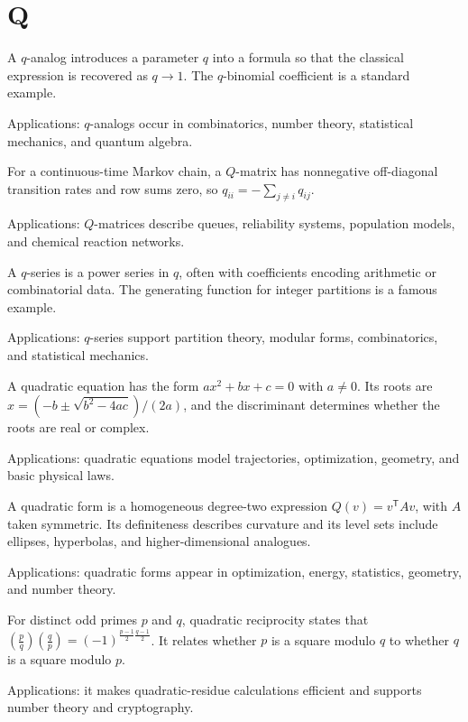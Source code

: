 \chapter*{Q}
\label{chap:q}

A $q$-analog introduces a parameter $q$ into a formula so that the classical expression is recovered as $q\to1$. The $q$-binomial coefficient is a standard example. \par\noindent Applications: $q$-analogs occur in combinatorics, number theory, statistical mechanics, and quantum algebra.

For a continuous-time Markov chain, a $Q$-matrix has nonnegative off-diagonal transition rates and row sums zero, so $q_{ii}=-\sum_{j\ne i}q_{ij}$. \par\noindent Applications: $Q$-matrices describe queues, reliability systems, population models, and chemical reaction networks.

A $q$-series is a power series in $q$, often with coefficients encoding arithmetic or combinatorial data. The generating function for integer partitions is a famous example. \par\noindent Applications: $q$-series support partition theory, modular forms, combinatorics, and statistical mechanics.

A quadratic equation has the form $ax^2+bx+c=0$ with $a\ne0$. Its roots are $x=(-b\pm\sqrt{b^2-4ac})/(2a)$, and the discriminant determines whether the roots are real or complex. \par\noindent Applications: quadratic equations model trajectories, optimization, geometry, and basic physical laws.

A quadratic form is a homogeneous degree-two expression $Q(v)=v^{\mathsf T}Av$, with $A$ taken symmetric. Its definiteness describes curvature and its level sets include ellipses, hyperbolas, and higher-dimensional analogues. \par\noindent Applications: quadratic forms appear in optimization, energy, statistics, geometry, and number theory.

For distinct odd primes $p$ and $q$, quadratic reciprocity states that $\left(\frac{p}{q}\right)\left(\frac{q}{p}\right)=(-1)^{\frac{p-1}{2}\frac{q-1}{2}}$. It relates whether $p$ is a square modulo $q$ to whether $q$ is a square modulo $p$. \par\noindent Applications: it makes quadratic-residue calculations efficient and supports number theory and cryptography.

